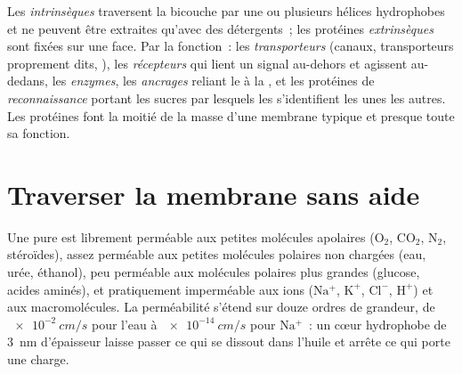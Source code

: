\begin{definition}\label{def:b1:membranes-transport:proteins}
Les 
\emph{intrinsèques} traversent la bicouche
par une ou plusieurs hélices hydrophobes et ne peuvent être extraites
qu'avec des détergents~; les protéines \emph{extrinsèques} sont fixées
sur une face. Par la fonction~: les \emph{transporteurs} (canaux,
transporteurs proprement dits, ), les \emph{récepteurs} qui lient
un signal au-dehors et agissent au-dedans, les \emph{enzymes}, les
\emph{ancrages} reliant le  à la ,
et les protéines de \emph{reconnaissance} portant les sucres par
lesquels les  s'identifient les unes les autres. Les protéines
font la moitié de la masse d'une membrane typique et presque toute sa
fonction.
\end{definition}

\section{Traverser la membrane sans aide}

\begin{proposition}\label{prop:b1:membranes-transport:permeability}
Une  pure est librement perméable aux petites
molécules apolaires ($\mathrm{O_2}$, $\mathrm{CO_2}$, $\mathrm{N_2}$,
stéroïdes), assez perméable aux petites molécules polaires non chargées
(eau, urée, éthanol), peu perméable aux molécules polaires plus grandes
(glucose, acides aminés), et pratiquement imperméable aux ions
($\mathrm{Na^+}$, $\mathrm{K^+}$, $\mathrm{Cl^-}$, $\mathrm{H^+}$) et
aux macromolécules. La perméabilité s'étend sur douze ordres de
grandeur, de $\qty{e-2}{cm/s}$ pour l'eau à $\qty{e-14}{cm/s}$ pour
$\mathrm{Na^+}$~: un cœur hydrophobe de \qty{3}{nm} d'épaisseur laisse
passer ce qui se dissout dans l'huile et arrête ce qui porte une charge.
\end{proposition}

